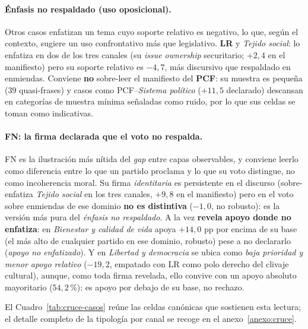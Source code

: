 \paragraph{Énfasis no respaldado (uso oposicional).}
Otros casos enfatizan un tema cuyo soporte relativo es negativo, lo que, según el
contexto, sugiere un uso confrontativo más que legislativo. \textbf{LR} y
\emph{Tejido social}: lo enfatiza en dos de los tres canales (su \emph{issue
ownership} securitario; $+2{,}4$ en el manifiesto) pero su soporte relativo es
$-4{,}7$, más discursivo que respaldado en enmiendas. Conviene \textbf{no}
sobre-leer el manifiesto del \textbf{PCF}: su muestra es pequeña ($39$ quasi-frases)
y casos como PCF--\emph{Sistema político} ($+11{,}5$ declarado) descansan en
categorías de muestra mínima señaladas como ruido, por lo que sus celdas se toman
como indicativas.

\paragraph{FN: la firma declarada que el voto no respalda.}
FN es la ilustración más nítida del \emph{gap} entre capas observables, y conviene
leerlo como diferencia entre lo que un partido proclama y lo que su voto distingue,
no como incoherencia moral. Su firma \emph{identitaria} es persistente en el
discurso (sobre-enfatiza \emph{Tejido social} en los tres canales, $+9{,}8$
en el manifiesto) pero en el voto sobre enmiendas de ese dominio \textbf{no es
distintiva} ($-1{,}0$, no robusto): es la versión más pura del \emph{énfasis no
respaldado}. A la vez \textbf{revela apoyo donde no enfatiza}: en \emph{Bienestar
y calidad de vida} apoya $+14{,}0$ pp por encima de su base (el más alto de cualquier partido
en ese dominio, robusto) pese a no declararlo (\emph{apoyo no enfatizado}). Y
en \emph{Libertad y democracia} se ubica como \emph{baja prioridad y menor apoyo
relativo} ($-19{,}2$, empatado con LR como polo derecho del clivaje cultural),
aunque, como toda firma revelada, ello convive con un apoyo absoluto mayoritario
($54{,}2\,\%$): es apoyo por debajo de su base, no rechazo.

El Cuadro~\ref{tab:cruce-casos} reúne las celdas canónicas que sostienen esta
lectura; el detalle completo de la tipología por canal se recoge en el
anexo~\ref{anexo:cruce}.

